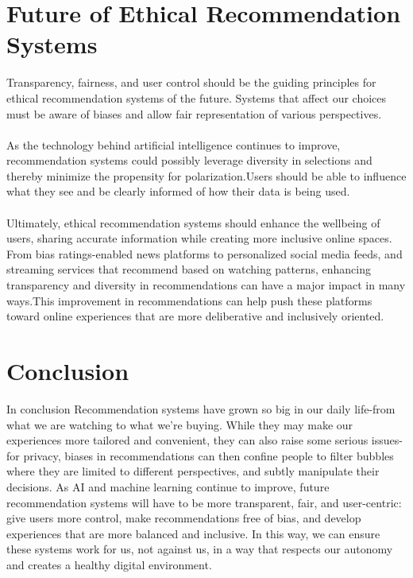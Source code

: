 \documentclass{article}
\begin{document}
\section{Future of Ethical Recommendation Systems}
Transparency, fairness, and user control should be the guiding principles for
ethical recommendation systems of the future. Systems that affect our choices must be
aware of biases and allow fair representation of various perspectives.\\\\
As the technology behind artificial intelligence continues to improve, recommendation systems could possibly leverage diversity in selections and thereby minimize the propensity for polarization.Users should be able to influence what they see and be clearly informed of how their data is being used.\\\\Ultimately, ethical recommendation systems should enhance the wellbeing of users, sharing accurate information while creating more inclusive online spaces.
From bias ratings-enabled news platforms to personalized social media feeds, and streaming services that recommend based on watching patterns, enhancing transparency and diversity in recommendations can have a major impact in many ways.This improvement in recommendations can help push these platforms toward online experiences that are more deliberative and inclusively oriented. 

\section{Conclusion}
In conclusion Recommendation systems have grown so big in our daily life-from what we are watching to what we're buying. While they may make our experiences more tailored and convenient, they can also raise some serious issues-for privacy, biases in recommendations can then confine people to filter bubbles where they are limited to different perspectives, and subtly manipulate their decisions. As AI and machine learning continue to improve, future recommendation systems will have to be more transparent, fair, and user-centric: give users more control, make recommendations free of bias, and develop experiences that are more balanced and inclusive. In this way, we can ensure these systems work for us, not against us, in a way that respects our autonomy and creates a healthy digital environment.


\end{document}
